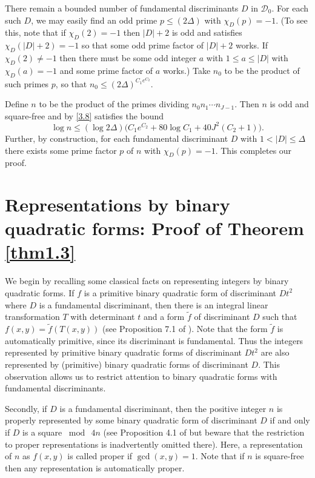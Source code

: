 \documentclass[11pt,makeidx, reqno]{amsart}
\theoremstyle{mystyle}
\theoremstyle{definition}
\begin{document}
  
There remain a bounded number of fundamental discriminants $D$ in ${\mathcal D}_0$.  For each such $D$, we may easily find an odd prime $p\le (2\Delta)$ with $\chi_D(p)=-1$.  (To see this, note that if $\chi_D(2)=-1$ then $|D|+2$ is odd and satisfies $\chi_D(|D|+2)=-1$ so that some odd prime factor of $|D|+2$ works.  If $\chi_D(2)\neq -1$ then there must be some odd integer $a$ with $1\le a\le |D|$ with $\chi_D(a)=-1$ and some prime factor of $a$ works.)  Take $n_0$ to be the product of such primes $p$, so that $n_0 \le (2\Delta)^{C_1 e^{C_2}}$.  

Define $n$ to be the product of the primes dividing $n_0 n_1\cdots n_{J-1}$.  Then $n$ is odd and square-free and by \eqref{3.8} satisfies the bound 
$$ 
\log n \le (\log 2\Delta) \Big( C_1 e^{C_2} + 80 \log C_1 + 40 J^2 (C_2+1)\Big).
$$
Further, by construction, for each fundamental discriminant $D$ with $1<|D|\le \Delta$ there exists some prime factor $p$ of $n$ with $\chi_D(p)=-1$.  This completes our proof. 


 



\section{Representations by binary quadratic forms: Proof of Theorem \ref{thm1.3}}\label{applications}

 
\noindent We begin by recalling some classical facts on representing integers by binary quadratic forms.   If $f$ is a primitive binary quadratic form of discriminant $Dt^2$ where $D$ is a fundamental discriminant, then there is an integral linear transformation $T$ with determinant $t$ and a form ${\tilde f}$ of discriminant $D$ such that $f(x,y)= {\tilde f}(T(x,y))$ (see Proposition 7.1 of \cite{buellBinary}).   Note that the form ${\tilde f}$ is automatically primitive, since its discriminant is fundamental.  Thus the integers represented by primitive binary quadratic forms of discriminant $Dt^2$ are also represented by (primitive) binary quadratic forms of discriminant $D$. This observation allows us to restrict attention to binary quadratic forms with fundamental discriminants.

Secondly, if $D$ is a fundamental discriminant, then the positive integer $n$ is properly represented by some binary quadratic form of discriminant $D$ if and only if $D$ is a square $\bmod \ {4n}$ (see Proposition 4.1 of \cite{buellBinary} but beware that the restriction to proper representations is inadvertently omitted there).  Here, a representation of $n$ as $f(x,y)$ is called proper if $\gcd(x,y)=1$.  Note that if $n$ is square-free then any representation is automatically proper.    
\end{document}
